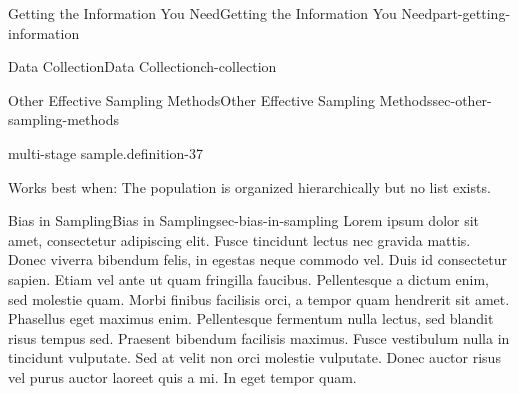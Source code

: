 \documentclass[oneside,10pt,]{book}
\numberwithin{equation}{section}
\begin{document}
\begin{partptx}{Getting the Information You Need}{}{Getting the Information You Need}{}{}{part-getting-information}
\begin{chapterptx}{Data Collection}{}{Data Collection}{}{}{ch-collection}
\begin{sectionptx}{Other Effective Sampling Methods}{}{Other Effective Sampling Methods}{}{}{sec-other-sampling-methods}
\begin{definition}{multi-stage sample.}{definition-37}
\par
\hypertarget{p-29}{}%
Works best when: The population is organized hierarchically but no list exists.%
\end{definition}
\end{sectionptx}
%
%
\typeout{************************************************}
\typeout{************************************************}
%
\begin{sectionptx}{Bias in Sampling}{}{Bias in Sampling}{}{}{sec-bias-in-sampling}
\hypertarget{p-30}{}%
Lorem ipsum dolor sit amet, consectetur adipiscing elit. Fusce tincidunt lectus nec gravida mattis. Donec viverra bibendum felis, in egestas neque commodo vel. Duis id consectetur sapien. Etiam vel ante ut quam fringilla faucibus. Pellentesque a dictum enim, sed molestie quam. Morbi finibus facilisis orci, a tempor quam hendrerit sit amet. Phasellus eget maximus enim. Pellentesque fermentum nulla lectus, sed blandit risus tempus sed. Praesent bibendum facilisis maximus. Fusce vestibulum nulla in tincidunt vulputate. Sed at velit non orci molestie vulputate. Donec auctor risus vel purus auctor laoreet quis a mi. In eget tempor quam.%
\end{sectionptx}
\end{chapterptx}
\end{partptx}
%
%
\typeout{************************************************}
\typeout{************************************************}
%
\end{document}
